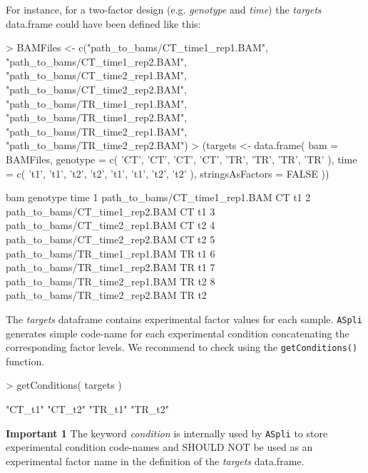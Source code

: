 \documentclass{article}
\begin{document}
For instance, for a two-factor design (e.g. {\em genotype} and {\em time}) the {\em targets} 
data.frame could have been defined like this:

\begin{Schunk}
\begin{Sinput}
> BAMFiles <- c("path_to_bams/CT_time1_rep1.BAM", "path_to_bams/CT_time1_rep2.BAM",
               "path_to_bams/CT_time2_rep1.BAM", "path_to_bams/CT_time2_rep2.BAM",
               "path_to_bams/TR_time1_rep1.BAM", "path_to_bams/TR_time1_rep2.BAM",
               "path_to_bams/TR_time2_rep1.BAM", "path_to_bams/TR_time2_rep2.BAM")
> (targets <- data.frame( bam = BAMFiles,
                         genotype = c( 'CT', 'CT', 'CT',  'CT', 
                                       'TR', 'TR', 'TR', 'TR' ),
                         time     = c( 't1', 't1', 't2', 't2', 
                                       't1', 't1', 't2', 't2' ),
                          stringsAsFactors = FALSE ))
\end{Sinput}
\begin{Soutput}
                             bam genotype time
1 path_to_bams/CT_time1_rep1.BAM       CT   t1
2 path_to_bams/CT_time1_rep2.BAM       CT   t1
3 path_to_bams/CT_time2_rep1.BAM       CT   t2
4 path_to_bams/CT_time2_rep2.BAM       CT   t2
5 path_to_bams/TR_time1_rep1.BAM       TR   t1
6 path_to_bams/TR_time1_rep2.BAM       TR   t1
7 path_to_bams/TR_time2_rep1.BAM       TR   t2
8 path_to_bams/TR_time2_rep2.BAM       TR   t2
\end{Soutput}
\end{Schunk}


The {\em targets} dataframe contains experimental factor values for each sample. \texttt{ASpli} generates simple code-name for each experimental condition concatenating the corresponding factor levels. We recommend to check using the \texttt{getConditions()} function. 

\begin{Schunk}
\begin{Sinput}
> getConditions( targets )
\end{Sinput}
\begin{Soutput}
[1] "CT_t1" "CT_t2" "TR_t1" "TR_t2"
\end{Soutput}
\end{Schunk}


\textbf{Important 1} The keyword {\em condition} is internally used by \texttt{ASpli} to store experimental condition code-names and SHOULD NOT be used as an experimental factor name in the definition of the {\em targets} data.frame. 
\end{document}
